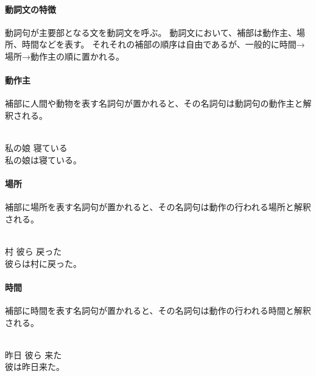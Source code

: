 \paragraph{動詞文の特徴}
動詞句が主要部となる文を動詞文を呼ぶ。
動詞文において、補部は動作主、場所、時間などを表す。
それそれの補部の順序は自由であるが、一般的に時間→場所→動作主の順に置かれる。

\paragraph{動作主}
補部に人間や動物を表す名詞句が置かれると、その名詞句は動詞句の動作主と解釈される。

\begin{exe}
    \ex \gll [r\'ea p\'aap\'a] [titop\'e\'a] \\
        私の娘 寝ている \\
    \glt 私の娘は寝ている。
\end{exe}

\paragraph{場所}
補部に場所を表す名詞句が置かれると、その名詞句は動作の行われる場所と解釈される。

\begin{exe}
    \ex {} \\
        村 彼ら 戻った \\
    \glt 彼らは村に戻った。
\end{exe}

\paragraph{時間}
補部に時間を表す名詞句が置かれると、その名詞句は動作の行われる時間と解釈される。

\begin{exe}
    \ex \gll [p\'a\'iip\'a] [k\'aeop\'a] [ve\'ip\'a] \\
        昨日 彼ら 来た \\
    \glt 彼は昨日来た。
\end{exe}